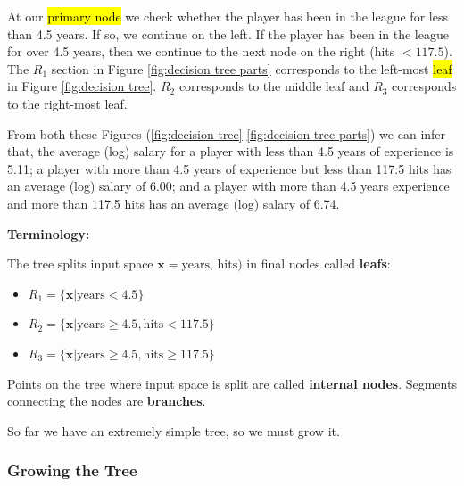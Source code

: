 \documentclass[11pt]{article}
\begin{document}
At our \hl{primary node} we check whether the player has been in the league for less than 4.5 years. If so, we continue on the left. If the player has been in the league for over 4.5 years, then we continue to the next node on the right (hits $< 117.5$). The $R_1$ section in Figure \ref{fig:decision tree parts} corresponds to the left-most \hl{leaf} in Figure \ref{fig:decision tree}. $R_2$ corresponds to the middle leaf and $R_3$ corresponds to the right-most leaf. 

\begin{note}
    From both these Figures (\ref{fig:decision tree} \ref{fig:decision tree parts}) we can infer that, the average (log) salary for a player with less than 4.5 years of experience is 5.11; a player with more than 4.5 years of experience but less than 117.5 hits has an average (log) salary of 6.00; and a player with more than 4.5 years experience and more than 117.5 hits has an average (log) salary of 6.74.
\end{note}

\begin{shaded}
    \textbf{Terminology:}

    The tree splits input space $\mathbf{x} = \text{years, hits})$ in final nodes called \textbf{leafs}:

    \begin{itemize}
        \item $R_1 = \{\mathbf{x}|\text{years} < 4.5\}$
        \item $R_2 = \{\mathbf{x}|\text{years} \geq 4.5, \text{hits}<117.5\}$
        \item $R_3 = \{\mathbf{x}|\text{years} \geq 4.5, \text{hits}\geq 117.5\}$
    \end{itemize}

    Points on the tree where input space is split are called \textbf{internal nodes}. Segments connecting the nodes are \textbf{branches}.
\end{shaded}

So far we have an extremely simple tree, so we must grow it.

\subsubsection{Growing the Tree}
\end{document}
